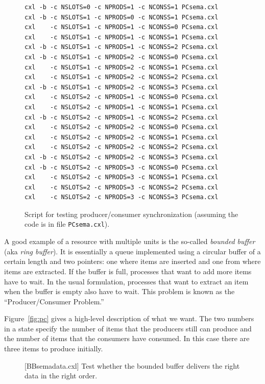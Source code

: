 \documentclass{report}
\newenvironment{code}{
\tcolorbox
}{
\endtcolorbox
}
\begin{document}
\begin{figure}
\begin{code}
\begin{verbatim}
cxl -b -c NSLOTS=0 -c NPRODS=1 -c NCONSS=1 PCsema.cxl
cxl -b -c NSLOTS=1 -c NPRODS=0 -c NCONSS=1 PCsema.cxl
cxl    -c NSLOTS=1 -c NPRODS=1 -c NCONSS=0 PCsema.cxl
cxl    -c NSLOTS=1 -c NPRODS=1 -c NCONSS=1 PCsema.cxl
cxl -b -c NSLOTS=1 -c NPRODS=1 -c NCONSS=2 PCsema.cxl
cxl -b -c NSLOTS=1 -c NPRODS=2 -c NCONSS=0 PCsema.cxl
cxl    -c NSLOTS=1 -c NPRODS=2 -c NCONSS=1 PCsema.cxl
cxl    -c NSLOTS=1 -c NPRODS=2 -c NCONSS=2 PCsema.cxl
cxl -b -c NSLOTS=1 -c NPRODS=2 -c NCONSS=3 PCsema.cxl
cxl    -c NSLOTS=2 -c NPRODS=1 -c NCONSS=0 PCsema.cxl
cxl    -c NSLOTS=2 -c NPRODS=1 -c NCONSS=1 PCsema.cxl
cxl -b -c NSLOTS=2 -c NPRODS=1 -c NCONSS=2 PCsema.cxl
cxl    -c NSLOTS=2 -c NPRODS=2 -c NCONSS=0 PCsema.cxl
cxl    -c NSLOTS=2 -c NPRODS=2 -c NCONSS=1 PCsema.cxl
cxl    -c NSLOTS=2 -c NPRODS=2 -c NCONSS=2 PCsema.cxl
cxl -b -c NSLOTS=2 -c NPRODS=2 -c NCONSS=3 PCsema.cxl
cxl -b -c NSLOTS=2 -c NPRODS=3 -c NCONSS=0 PCsema.cxl
cxl    -c NSLOTS=2 -c NPRODS=3 -c NCONSS=1 PCsema.cxl
cxl    -c NSLOTS=2 -c NPRODS=3 -c NCONSS=2 PCsema.cxl
cxl    -c NSLOTS=2 -c NPRODS=3 -c NCONSS=3 PCsema.cxl
\end{verbatim}
\end{code}
\caption{Script for testing producer/consumer synchronization
(assuming the code is in file \texttt{PCsema.cxl}).}
\label{fig:pcscript}
\end{figure}

A good example of a resource with multiple units is the
so-called \emph{bounded buffer} (aka \emph{ring buffer}).
It is essentially
a queue implemented using a circular buffer of a certain length and two pointers:
one where items are inserted and one from where items are extracted.  If the
buffer is full, processes that want to add more items have to wait.  In the usual
formulation, processes that want to extract an item when the buffer is empty
also have to wait.
This problem is known as the ``Producer/Consumer Problem.''

Figure~\ref{fig:pc} gives a high-level description of what we want.  The
two numbers in a state specify
the number of items that the producers still can produce and
the number of items that the consumers have consumed.  In this case
there are three items to produce initially.

\begin{figure}
\begin{code}
\end{code}
\caption{[BBsemadata.cxl] Test whether the bounded buffer delivers the right data in the
right order.}
\label{fig:PCsemadata}
\end{figure}
\end{document}
